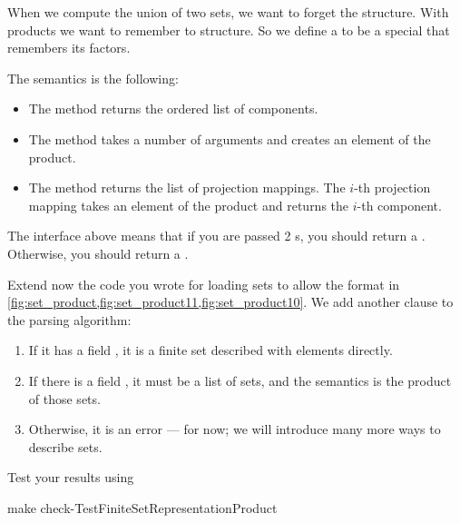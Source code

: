 
When we compute the union of two sets, we want to forget the structure.
With products we want to remember to structure.
So we define a  to be a special \Setoid that remembers its factors.


The semantics is the following:
\begin{itemize}
	\item The method  returns the ordered list of components.
	\item The method  takes a number of arguments and creates an element of the product.
	\item The method  returns the list of projection mappings.
	      The $i$-th projection mapping takes an element of the product and returns the $i$-th component.

\end{itemize}

The interface above means that if you are passed 2 \FiniteSet{}s, you should return a \FiniteSet.
Otherwise, you should return a \Setoid.


%

%

\begin{codeexercise}
	Extend now the code you wrote for loading sets to allow the format in \cref{fig:set_product,fig:set_product11,fig:set_product10}.
	We add another clause to the parsing algorithm:
	\begin{enumerate}
		\item If it has a field , it is a finite set described with elements directly.
		\item If there is a field , it must be a list of sets, and the semantics is the product of those sets.
		\item Otherwise, it is an error --- for now; we will introduce many more ways to describe sets.
	\end{enumerate}
	Test your results using
	\begin{console}
		make check-TestFiniteSetRepresentationProduct
	\end{console}
\end{codeexercise}
